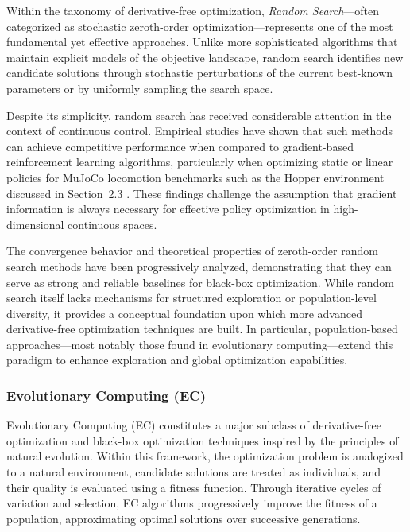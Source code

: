 Within the taxonomy of derivative-free optimization, \textit{Random Search}—often categorized as stochastic zeroth-order optimization—represents one of the most fundamental yet effective approaches. Unlike more sophisticated algorithms that maintain explicit models of the objective landscape, random search identifies new candidate solutions through stochastic perturbations of the current best-known parameters or by uniformly sampling the search space.

Despite its simplicity, random search has received considerable attention in the context of continuous control. Empirical studies have shown that such methods can achieve competitive performance when compared to gradient-based reinforcement learning algorithms, particularly when optimizing static or linear policies for MuJoCo locomotion benchmarks such as the Hopper environment discussed in Section~2.3 \citep{mania2018randomsearch}. These findings challenge the assumption that gradient information is always necessary for effective policy optimization in high-dimensional continuous spaces.

The convergence behavior and theoretical properties of zeroth-order random search methods have been progressively analyzed, demonstrating that they can serve as strong and reliable baselines for black-box optimization. While random search itself lacks mechanisms for structured exploration or population-level diversity, it provides a conceptual foundation upon which more advanced derivative-free optimization techniques are built. In particular, population-based approaches—most notably those found in evolutionary computing—extend this paradigm to enhance exploration and global optimization capabilities.

\subsubsection{Evolutionary Computing (EC)}

Evolutionary Computing (EC) constitutes a major subclass of derivative-free optimization and black-box optimization techniques inspired by the principles of natural evolution. Within this framework, the optimization problem is analogized to a natural environment, candidate solutions are treated as individuals, and their quality is evaluated using a fitness function. Through iterative cycles of variation and selection, EC algorithms progressively improve the fitness of a population, approximating optimal solutions over successive generations.


